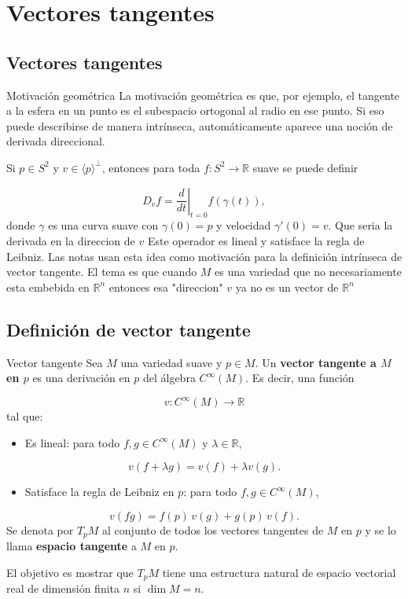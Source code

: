 \chapter{Vectores tangentes}
\label{ch:teo-5}
\section{Vectores tangentes}
\begin{bookremark}{Motivación geométrica}
La motivación geométrica es que, por ejemplo, el tangente a la esfera en un punto es el subespacio ortogonal al radio en ese punto. Si eso puede describirse de manera intrínseca, automáticamente aparece una noción de derivada direccional.

Si $p\in S^2$ y $v\in \langle p\rangle^\perp$, entonces para toda $f:S^2\to\mathbb{R}$ suave se puede definir

\[
D_vf=\left.\frac{d}{dt}\right|_{t=0}f(\gamma(t)),
\]
donde $\gamma$ es una curva suave con $\gamma(0)=p$ y velocidad $\gamma'(0)=v$. Que seria la derivada en la direccion de $v$ Este operador es lineal y satisface la regla de Leibniz. Las notas usan esta idea como motivación para la definición intrínseca de vector tangente. El tema es que cuando $M$ es una variedad que no necesariamente esta embebida en $\mathbb{R}^{n}$ entonces esa "direccion" $v$ ya no es un vector de $\mathbb{R}^{n}$

\end{bookremark}
\section{Definición de vector tangente}
\begin{bookdefinition}{Vector tangente}
Sea $M$ una variedad suave y $p\in M$. Un \textbf{vector tangente a $M$ en $p$} es una derivación en $p$ del álgebra $C^\infty(M)$. Es decir, una función

\[
v:C^\infty(M)\to\mathbb{R}
\]
tal que:

\begin{itemize}
\item Es lineal: para todo $f,g\in C^\infty(M)$ y $\lambda\in\mathbb{R}$,
\end{itemize}
\[
v(f+\lambda g)=v(f)+\lambda v(g).
\]
\begin{itemize}
\item Satisface la regla de Leibniz en $p$: para todo $f,g\in C^\infty(M)$,
\end{itemize}
\[
v(fg)=f(p)\,v(g)+g(p)\,v(f).
\]
Se denota por $T_pM$ al conjunto de todos los vectores tangentes de $M$ en $p$ y se lo llama \textbf{espacio tangente} a $M$ en $p$.

El objetivo es mostrar que $T_pM$ tiene una estructura natural de espacio vectorial real de dimensión finita $n$ si $\dim M=n$.

\end{bookdefinition}
